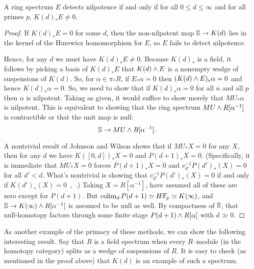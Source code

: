 \begin{corollary}\label{LocalNilpotenceDetection}
A ring spectrum $E$ detects nilpotence if and only if for all $0 \le d \le \infty$ and for all primes $p$, $K(d)_* E \ne 0$.
\end{corollary}
\begin{proof}
If $K(d)_* E = 0$ for some $d$, then the non-nilpotent map $\S \to K(d)$ lies in the kernel of the Hurewicz homomorphism for $E$, so $E$ fails to detect nilpotence.

Hence, for any $d$ we must have $K(d)_* E \ne 0$.  Because $K(d)_*$ is a field, it follows by picking a basis of $K(d)_* E$ that $K(d) \sm E$ is a nonempty wedge of suspensions of $K(d)$.  So, for $\alpha \in \pi_* R$, if $E_* \alpha = 0$ then $(K(d) \sm E)_* \alpha = 0$ and hence $K(d)_* \alpha = 0$.  So, we need to show that if $K(d)_* \alpha = 0$ for all $n$ and all $p$ then $\alpha$ is nilpotent.  Taking  as given, it would suffice to show merely that $MU_* \alpha$ is nilpotent.  This is equivalent to showing that the ring spectrum $MU \sm R[\alpha^{-1}]$ is contractible or that the unit map is null: \[\S \to MU \sm R[\alpha^{-1}].\]

A nontrivial result of Johnson and Wilson shows that if $MU_* X = 0$ for any $X$, then for any $d$ we have $K([0, d])_* X = 0$ and $P(d+1)_* X = 0$.  (Specifically, it is immediate that $MU_* X = 0$ forces $P(d+1)_* X = 0$ and $v_{d'}^{-1} P(d')_*(X) = 0$ for all $d' < d$.  What's nontrivial is showing that $v_{d'}^{-1} P(d')_*(X) = 0$ if and only if $K(d')_*(X) = 0$~\cite[Theorem 2.1.a]{RavenelLocalizationWRTPeriodic},~\cite[Section 3]{JohnsonWilson}.)  Taking $X = R[\alpha^{-1}]$, have assumed all of these are zero except for $P(d+1)$.  But $\colim_d P(d+1) \simeq H\F_p \simeq K(\infty)$, and $\S \to K(\infty) \sm R[\alpha^{-1}]$ is assumed to be null as well.  By compactness of $\S$, that null-homotopy factors through some finite stage $P(d+1) \sm R[\alpha]$ with $d \gg 0$.
\end{proof}

As another example of the primacy of these methods, we can show the following interesting result.  Say that $R$ is a field spectrum when every $R$--module (in the homotopy category) splits as a wedge of suspensions of $R$.  It is easy to check (as mentioned in the proof above) that $K(d)$ is an example of such a spectrum.

